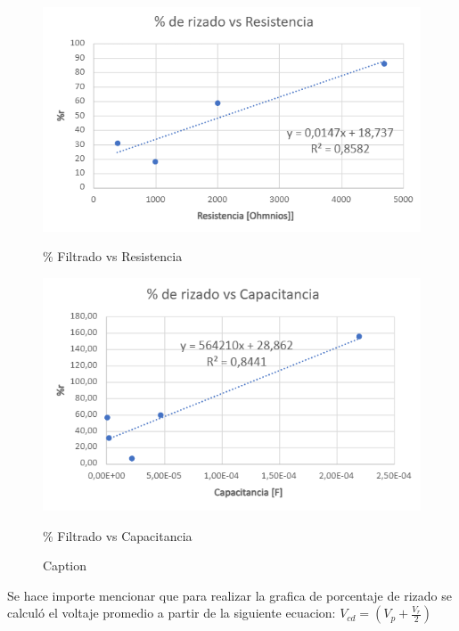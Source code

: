 \documentclass[10pt,letterpaper]{article}
\begin{document}
\begin{figure}[H]
    \centering
    \begin{minipage}[b]{0.45\textwidth}
        \centering
        \includegraphics[scale=0.65]{FiltradoResitencia_plt.png}
        \caption*{\% Filtrado vs Resistencia}
    \end{minipage}
            \begin{minipage}[b]{0.45\textwidth}
        \centering
        \includegraphics[scale=0.65]{FiltradoCapacitancia_plt.png}
        \caption*{\% Filtrado vs Capacitancia}
    \end{minipage}
    \caption{Caption}
    \label{fig:olv}
\end{figure}
Se hace importe mencionar que para realizar la grafica de porcentaje de rizado
se calculó el voltaje promedio a partir de la siguiente ecuacion:
$V_{cd}=(V_{p}+\frac{V_{r}}{2})$
\end{document}
